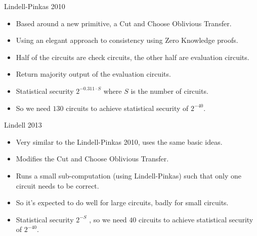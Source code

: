 \documentclass[t, 12pt]{beamer}            %
\begin{document}
\begin{frame}{Lindell-Pinkas 2010}
	\begin{itemize} %
		\item Based around a new primitive, a Cut and Choose Oblivious Transfer.
		\item Using an elegant approach to consistency using Zero Knowledge proofs.
		\item Half of the circuits are check circuits, the other half are evaluation circuits.
		\item Return majority output of the evaluation circuits.
		\item Statistical security $2^{-0.311 \cdot S}$  where $S$ is the number of circuits.
		\item So we need $130$ circuits to achieve statistical security of $2^{-40}$.
	\end{itemize}

\end{frame}


\begin{frame}{Lindell 2013}
	\begin{itemize} %
		\item Very similar to the Lindell-Pinkas 2010, uses the same basic ideas.
		\item Modifies the Cut and Choose Oblivious Transfer.
		\item Runs a small sub-computation (using Lindell-Pinkas) such that only one circuit needs to be correct.
		\item So it's expected to do well for large circuits, badly for small circuits.
		\item Statistical security $2^{-S}$ , so we need $40$ circuits to achieve statistical security of $2^{-40}$.
	\end{itemize}

\end{frame}
\end{document}
